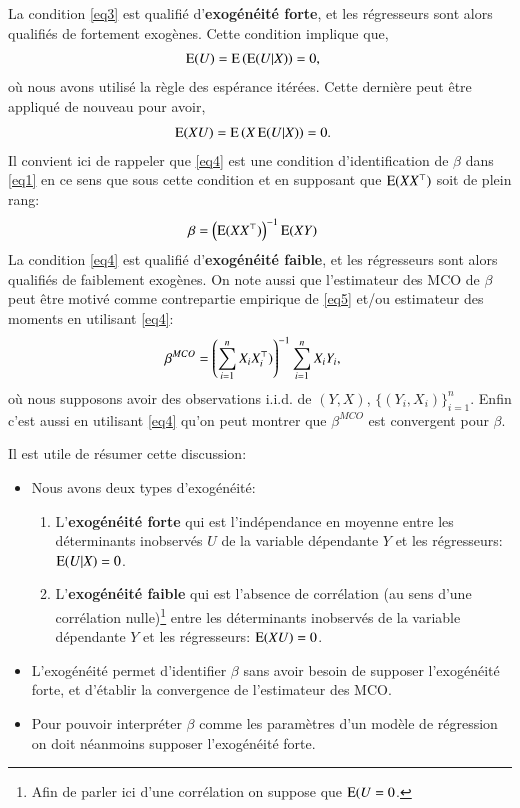 \documentclass[10pt, reqno]{amsart}
\begin{document}
La condition \eqref{eq3} est qualifié d'\textbf{exogénéité forte}, et les régresseurs sont alors qualifiés de fortement exogènes. 
Cette condition implique que, 
\begin{align*}
	\operatorname{E}(U) &= \operatorname{E}\left(\operatorname{E}(U|X)\right) = 0,
\end{align*}
où nous avons utilisé la règle des espérance itérées. Cette dernière peut être appliqué de nouveau pour avoir,
\begin{align}
	\operatorname{E}(XU) &= \operatorname{E}\left(X\operatorname{E}(U|X)\right) = 0.
	\label{eq4}
\end{align}
Il convient ici de rappeler que \eqref{eq4} est une condition d'identification de $\beta$ dans \eqref{eq1} en ce sens que
sous cette condition et en supposant que $\operatorname{E}(XX^\top)$ soit de plein rang:
\begin{align}
\beta &=\left(\operatorname{E}(XX^\top)\right)^{-1}\operatorname{E}(XY)
\label{eq5}
\end{align}
La condition \eqref{eq4} est qualifié d'\textbf{exogénéité faible}, et les régresseurs sont alors qualifiés de faiblement exogènes. 
On note aussi que l'estimateur des MCO de $\beta$ peut être motivé comme contrepartie empirique de \eqref{eq5} et/ou
estimateur des moments en utilisant \eqref{eq4}:
\begin{align}
	\beta^{MCO} &=\left(\sum_{i=1}^n X_iX_i^\top)\right)^{-1}\sum_{i=1}^n X_iY_i,
	\label{eq6}
\end{align}
où nous supposons avoir des observations i.i.d. de $(Y, X)$, $\{(Y_i, X_i)\}_{i=1}^n$. Enfin c'est aussi en 
utilisant  \eqref{eq4} qu'on peut montrer que $\beta^{MCO}$ est convergent pour $\beta$.

Il est utile de résumer cette discussion:
\begin{itemize}[label = -]
	\item Nous avons deux types d'exogénéité: 
	\begin{enumerate}
		\item L'\textbf{exogénéité forte} qui est l'indépendance en moyenne entre les déterminants inobservés 
		$U$ de la variable dépendante $Y$ et les régresseurs: $\operatorname{E}(U|X) = 0$.
		\item L'\textbf{exogénéité faible} qui est l'absence de corrélation
		(au sens d'une corrélation nulle)\footnote{Afin de parler ici d'une corrélation on suppose que $\operatorname{E}(U=0$.} 
		entre les déterminants inobservés de la variable dépendante $Y$ et les régresseurs: $\operatorname{E}(XU) = 0$.
	\end{enumerate}
	\item L'exogénéité permet d'identifier $\beta$ sans avoir besoin de supposer l'exogénéité forte, et
	 d'établir la convergence de l'estimateur des MCO.
	 \item Pour pouvoir interpréter $\beta$ comme les paramètres d'un modèle de régression on doit 
	 néanmoins supposer l'exogénéité forte.
\end{itemize}
\end{document}
